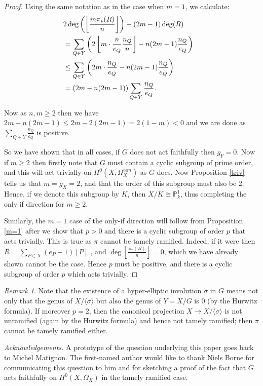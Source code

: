 \documentclass[11pt]{article} %
\theoremstyle{remark}\newtheorem*{rem}{Remark}
\begin{document}
\begin{proof}
    Using the same notation as in the case when $m=1$, we calculate:
      \begin{align*}
	\lefteqn{2\deg\left(\left\lfloor\frac{m\pi_*(R)}{n}\right\rfloor\right)-(2m-1)\deg(R)}\\
	& = \sum_{Q \in Y} \left(2\left\lfloor m\cdot \frac{n}{e_Q}\frac{n_Q}{n}\right\rfloor -n(2m-1)\frac{n_Q}{e_Q}\right) \\
	&\leq   \sum_{Q\in Y}\left( 2m\cdot\frac{n_Q}{e_Q}-n(2m-1)\frac{n_Q}{e_Q}\right) \\
	& =  (2m-n(2m-1))\sum_{Q\in Y }\frac{n_Q}{e_Q}.
      \end{align*}

    Now as $n,m\geq 2$ then we have $2m-n(2m-1)\leq 2m-2(2m-1)=2(1-m)<0$ and we are done as $\sum_{Q\in Y}\frac{n_Q}{e_Q}$ is positive.

    So we have shown that in all cases, if $G$ does not act faithfully then $g_Y=0$.
    Now if $m\geq 2$ then firstly note that $G$ must contain a cyclic subgroup of prime order, and this will act trivially on $H^0(X,\Omega_X^{\otimes m})$ as $G$ does.
    Now Proposition \ref{triv} tells us that $m=g_X=2$, and that the order of this subgroup must also be 2.
    Hence, if we denote this subgroup by $K$, then $X/K\cong \mathbb{P}_k^1$, thus completing the only if direction for $m\geq 2$.
    
    Similarly, the $m=1$ case of the only-if direction will follow from Proposition \ref{m=1} after we show that $p>0$ and there is a cyclic subgroup of order $p$ that acts trivially. 
    This is true as $\pi$ cannot be tamely ramified.
    Indeed, if it were then $R=\sum_{P\in X} (e_P-1)[P]$ \cite[{\S} IV, Cor. 2.4]{hart}, and $\deg\left\lfloor \frac{\pi_*(R)}{n} \right\rfloor=0$, which we have already shown cannot be the case.
    Hence $p$ must be positive, and there is a cyclic subgroup of order $p$ which acts trivially.
  \end{proof}

\begin{rem}
  Note that the existence of a hyper-elliptic involution $\sigma$ in $G$ means not only that the genus of $X/\langle \sigma \rangle$ but also the genus of $Y=X/G$ is $0$ (by the Hurwitz formula).
  If moreover $p=2$, then the canonical projection $X\rightarrow X/\langle \sigma \rangle$ is not unramified (again by the Hurwitz formula) and hence not tamely ramified; then $\pi$ cannot be tamely ramified either.
\end{rem}

{\em Acknowledgements.} A prototype of the question underlying this paper goes
back to Michel Matignon. The first-named author would like to thank Niels Borne for
communicating this question to him and for sketching a proof of the fact that $G$ acts
faithfully on $H^0(X,\Omega_X)$ in the tamely ramified case.



\end{document}
